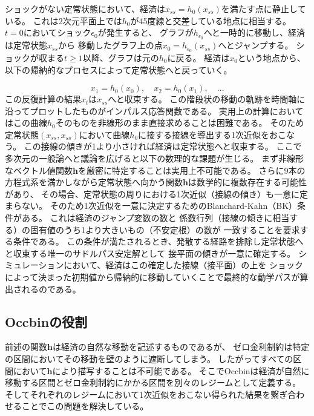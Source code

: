 ショックがない定常状態において、経済は\(x_{ss}=h_0(x_{ss})\)を満たす点に静止している。
これは2次元平面上では\(h_0\)が45度線と交差している地点に相当する。
\(t=0\)においてショック\(\epsilon_0\)が発生すると、
グラフが\(h_{\epsilon_0}\)へと一時的に移動し、経済は定常状態\(x_{ss}\)から
移動したグラフ上の点\(x_0=h_{\epsilon_0}(x_{ss})\)へとジャンプする。
ショックが収まる\(t\ge1\)以降、グラフは元の\(h_0\)に戻る。
経済は\(x_0\)という地点から、以下の帰納的なプロセスによって定常状態へと戻っていく。



\begin{equation}
x_1=h_0(x_0),\quad x_2=h_0(x_1),\quad\dots
\label{form:model_preparation_method_dynare_iterative_convergence}
\end{equation}
この反復計算の結果\(x_t\)は\(x_{ss}\)へと収束する。
この階段状の移動の軌跡を時間軸に沿ってプロットしたものがインパルス応答関数である。
実用上の計算においてはこの曲線\(h_0\)そのものを非線形のまま直接求めることは困難である。
そのため定常状態\((x_{ss},x_{ss})\)において曲線\(h_0\)に接する接線を導出する1次近似をおこなう。
この接線の傾きが1より小さければ経済は定常状態へと収束する。
ここで多次元の一般論へと議論を広げると以下の数理的な課題が生じる。
まず非線形なベクトル値関数\(\mathbf{h}\)を厳密に特定することは実用上不可能である。
さらに9本の方程式系を満かしながら定常状態へ向かう関数\(\mathbf{h}\)は数学的に複数存在する可能性があり、
その場合、定常状態の周りにおける1次近似（接線の傾き）も一意に定まらない。
そのため1次近似を一意に決定するためのBlanchard-Kahn（BK）条件がある。
これは経済のジャンプ変数の数と
係数行列（接線の傾きに相当する）の固有値のうち1より大きいもの（不安定根）の数が
一致することを要求する条件である。
この条件が満たされるとき、発散する経路を排除し定常状態へと収束する唯一のサドルパス安定解として
接平面の傾きが一意に確定する。
シミュレーションにおいて、経済はこの確定した接線（接平面）の上を
ショックによって決まった初期値から帰納的に移動していくことで最終的な動学パスが算出されるのである。

\subsection{Occbinの役割}
\label{sec:model_preparation_method_occbin}

前述の関数\(\mathbf{h}\)は経済の自然な移動を記述するものであるが、
ゼロ金利制約は特定の区間においてその移動を壁のように遮断してしまう。
したがってすべての区間において\(\mathbf{h}\)により描写することは不可能である。
そこでOccbinは経済が自然に移動する区間とゼロ金利制約にかかる区間を別々のレジームとして定義する。
そしてそれぞれのレジームにおいて1次近似をおこない得られた結果を繋ぎ合わせることでこの問題を解決している。

